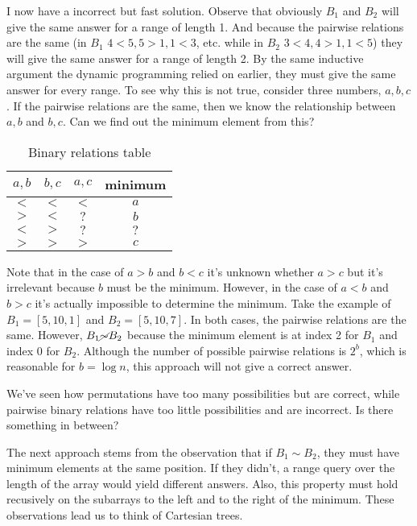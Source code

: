 \documentclass[11pt, oneside]{article}
\begin{document}
I now have a incorrect but fast solution. Observe that obviously \( B_1 \) and \( B_2 \) will
give the same answer for a range of length 1. And because the pairwise relations are the same (in \( B_1 \) \( 4 < 5, 5 > 1, 1 < 3 \), etc.
while in \( B_2 \) \(3 < 4, 4 > 1, 1 < 5 \)) they will give the same answer for a range of length 2.
By the same inductive argument the dynamic programming relied on earlier, they must give the same answer for every range.
To see why this is not true, consider three numbers, \( a, b, c \). If the pairwise relations are the same,
then we know the relationship between \( a, b \) and \( b, c \). Can we find out the minimum element from this?

\newpage

\begin{table}[ht!]
\centering
\begin{tabular}{ cccc }
 \( a, b \) & \( b, c \) & \( a, c \) & minimum \\
 \hline
 \( < \) & \( < \) & \( < \) & \( a \) \\
 \( > \) & \( < \) & \( ? \) & \( b \) \\
 \( < \) & \( > \) & \( ? \) & \( ? \) \\
 \( > \) & \( > \) & \( > \) & \( c \) \\
 \hline
\end{tabular}
\caption{Binary relations table}
\end{table}

Note that in the case of \( a > b \) and \( b < c \) it's unknown whether \( a > c \)
but it's irrelevant because \( b \) must be the minimum. However, in the case of \( a < b \)
and \( b > c \) it's actually impossible to determine the minimum. Take the example of
\( B_1 = [5, 10, 1] \) and \( B_2 = [5, 10, 7] \). In both cases, the pairwise relations are the same.
However, \( B_1 \cancel{\sim} B_2 \) because the minimum element is at index 2 for \( B_1 \) and
index 0 for \( B_2 \). Although the number of possible pairwise relations is \( 2^b \), which is reasonable
for \( b = \log n \), this approach will not give a correct answer.

We've seen how permutations have too many possibilities but are correct, while pairwise binary relations have
too little possibilities and are incorrect. Is there something in between?

The next approach stems from the observation that if \( B_1 \sim B_2 \), they must have minimum elements
at the same position. If they didn't, a range query over the length of the array would yield different answers.
Also, this property must hold recusively on the subarrays to the left and to the right of the minimum.
These observations lead us to think of Cartesian trees.
\end{document}
